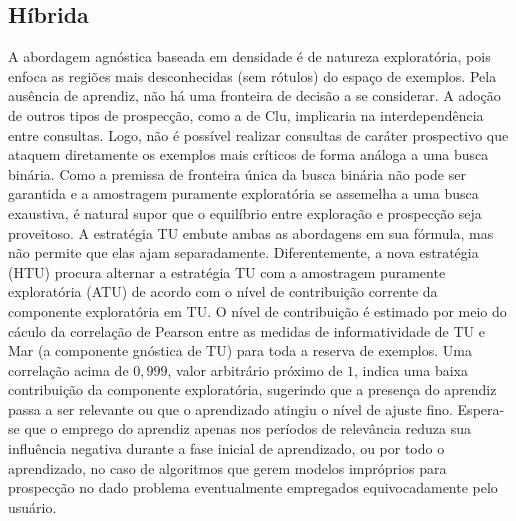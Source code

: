 \subsection{Híbrida}\label{htu}
A abordagem agnóstica baseada em densidade é de natureza exploratória,
pois enfoca as regiões mais desconhecidas (sem rótulos) do espaço de exemplos.
Pela ausência de aprendiz, não há uma fronteira de decisão a se considerar.
A adoção de outros tipos de prospecção, como a de Clu, 
implicaria na interdependência entre consultas.
Logo, não é possível realizar consultas de caráter prospectivo 
que ataquem diretamente os exemplos mais críticos de forma análoga a uma 
busca binária.
Como a premissa de fronteira única da busca binária não pode ser garantida e
a amostragem puramente exploratória se assemelha a uma busca exaustiva,
é natural supor que o equilíbrio entre exploração e prospecção seja proveitoso.
A estratégia TU embute ambas as abordagens em sua fórmula, mas não
permite que elas ajam separadamente.
Diferentemente,
a nova estratégia (HTU) procura alternar a estratégia TU com a amostragem
puramente exploratória (ATU) de acordo com o nível de contribuição corrente
da componente exploratória em TU.
O nível de contribuição é estimado por meio do cáculo da correlação de
Pearson \citep{books/daglib/0000786} entre as medidas de informatividade de
TU e Mar (a componente gnóstica de 
TU) para toda a reserva de exemplos.
Uma correlação acima de $0,999$, valor arbitrário próximo de $1$,
indica uma baixa contribuição da componente exploratória,
sugerindo que a presença do aprendiz passa a ser relevante ou
que o aprendizado atingiu o nível de ajuste fino.
Espera-se que o emprego do aprendiz apenas nos períodos de relevância
reduza sua influência negativa durante a fase inicial de aprendizado,
ou por todo o aprendizado, no caso de algoritmos que gerem modelos impróprios
para prospecção no dado problema eventualmente empregados equivocadamente
pelo usuário.


 
